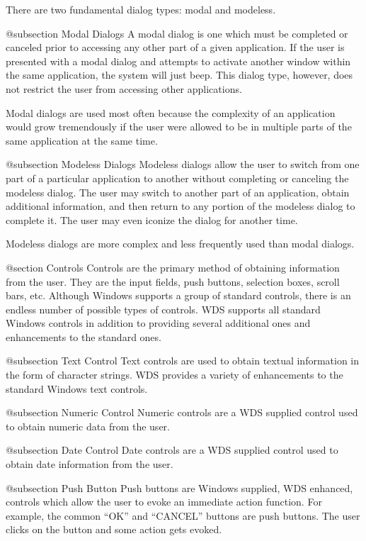 There are two fundamental dialog types: modal and modeless.

@subsection Modal Dialogs
A modal dialog is one which must be completed or canceled prior to
accessing any other part of a given application.  If the user is
presented with a modal dialog and attempts to activate another window
within the same application, the system will just beep.  This dialog
type, however, does not restrict the user from accessing other
applications.

Modal dialogs are used most often because the complexity of an application
would grow tremendously if the user were allowed to be in multiple parts
of the same application at the same time.

@subsection Modeless Dialogs
Modeless dialogs allow the user to switch from one part of a particular
application to another without completing or canceling the modeless dialog.
The user may switch to another part of an application, obtain additional
information, and then return to any portion of the modeless dialog to
complete it.  The user may even iconize the dialog for another time.

Modeless dialogs are more complex and less frequently used than modal
dialogs.

@section Controls
Controls are the primary method of obtaining information from the user.
They are the input fields, push buttons, selection boxes, scroll bars,
etc.  Although Windows supports a group of standard controls, there is
an endless number of possible types of controls.  WDS supports all
standard Windows controls in addition to providing several additional
ones and enhancements to the standard ones.

@subsection Text Control
Text controls are used to obtain textual information in the form
of character strings.  WDS provides a variety of enhancements to
the standard Windows text controls.


@subsection Numeric Control
Numeric controls are a WDS supplied control used to obtain numeric
data from the user.

@subsection Date Control
Date controls are a WDS supplied control used to obtain date information
from the user.

@subsection Push Button
Push buttons are Windows supplied, WDS enhanced, controls which allow
the user to evoke an immediate action function.  For example, the
common ``OK'' and ``CANCEL'' buttons are push buttons.  The user
clicks on the button and some action gets evoked.

